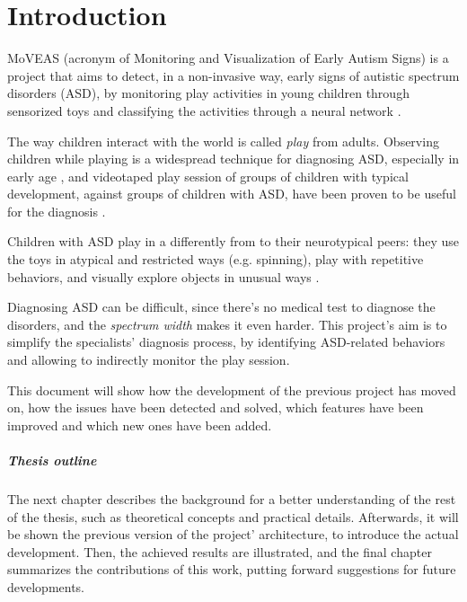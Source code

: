 \chapter{Introduction}
MoVEAS (acronym of Monitoring and Visualization of Early Autism Signs) is a project that aims to detect, in a non-invasive way, early signs of autistic spectrum disorders (ASD), by monitoring play activities in young children through sensorized toys and classifying the activities through a neural network \cite{Bon20, Lan19}.
\bigbreak

The way children interact with the world is called \textit{play} from adults. Observing children while playing is a widespread technique for diagnosing ASD, especially in early age \cite{Ozo08}, and videotaped play session of groups of children with typical development, against groups of children with ASD, have been proven to be useful for the diagnosis \cite{Bar05, Ozo08, Wet10}.

Children with ASD play in a differently from to their neurotypical peers: they use the toys in atypical and restricted ways (e.g. spinning), play with repetitive behaviors, and visually explore objects in unusual ways \cite{Bru07, Ozo08}.

Diagnosing ASD can be difficult, since there's no medical test to diagnose the disorders, and the \textit{spectrum width} makes it even harder. This project's aim is to simplify the specialists' diagnosis process, by identifying ASD-related behaviors and allowing to indirectly monitor the play session.
\bigbreak

This document will show how the development of the previous project has moved on, how the issues have been detected and solved, which features have been improved and which new ones have been added.
\bigbreak

\paragraph{Thesis outline}
The next chapter describes the background for a better understanding of the rest of the thesis, such as theoretical concepts and practical details. Afterwards, it will be shown the previous version of the project' architecture, to introduce the actual development. Then, the achieved results are illustrated, and the final chapter summarizes the contributions of this work, putting forward suggestions for future developments.
